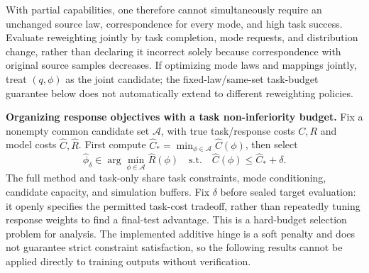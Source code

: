 With partial capabilities, one therefore cannot simultaneously require an unchanged source law, correspondence for every mode, and high task success.
Evaluate reweighting jointly by task completion, mode requests, and distribution change, rather than declaring it incorrect solely because correspondence
with original source samples decreases. If optimizing mode laws and mappings jointly, treat $(q,\phi)$ as the joint candidate;
the fixed-law/same-set task-budget guarantee below does not automatically extend to different reweighting policies.

\textbf{Organizing response objectives with a task non-inferiority budget.} Fix a nonempty common candidate set
$\mathcal A$, with true task/response costs $C,R$ and model costs
$\widehat C,\widehat R$. First compute $\widehat C_*=\min_{\phi\in\mathcal A}
\widehat C(\phi)$, then select
\begin{equation}
 \widehat\phi_\delta\in\arg\min_{\phi\in\mathcal A}\widehat R(\phi)
 \quad\text{s.t.}\quad
 \widehat C(\phi)\le\widehat C_*+\delta.
 \label{eq:task-band-transport}
\end{equation}
The full method and task-only share task constraints, mode conditioning, candidate capacity, and simulation buffers.
Fix $\delta$ before sealed target evaluation: it openly specifies the permitted task-cost tradeoff, rather than
repeatedly tuning response weights to find a final-test advantage.
This is a hard-budget selection problem for analysis. The implemented additive hinge is a soft penalty
and does not guarantee strict constraint satisfaction, so the following results cannot be applied directly to training outputs without verification.

